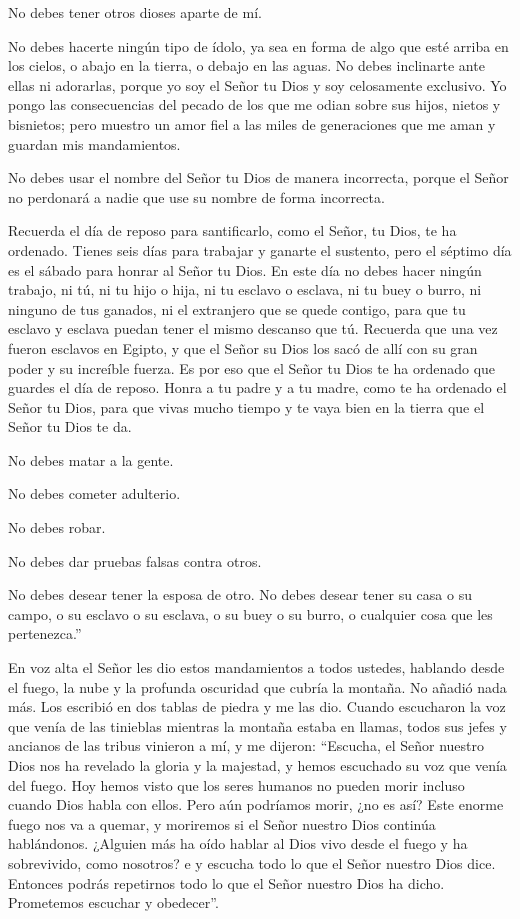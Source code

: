  No debes tener otros dioses aparte de mí.

 No debes hacerte ningún tipo de ídolo, ya sea en forma de
algo que esté arriba en los cielos, o abajo en la tierra, o debajo en
las aguas.  No debes inclinarte ante ellas ni adorarlas,
porque yo soy el Señor tu Dios y soy celosamente exclusivo. Yo pongo las
consecuencias del pecado de los que me odian sobre sus hijos, nietos y
bisnietos;  pero muestro un amor fiel a las miles de
generaciones que me aman y guardan mis mandamientos.

 No debes usar el nombre del Señor tu Dios de manera
incorrecta, porque el Señor no perdonará a nadie que use su nombre de
forma incorrecta.

 Recuerda el día de reposo para santificarlo, como el
Señor, tu Dios, te ha ordenado.  Tienes seis días para
trabajar y ganarte el sustento,  pero el séptimo día es el
sábado para honrar al Señor tu Dios. En este día no debes hacer ningún
trabajo, ni tú, ni tu hijo o hija, ni tu esclavo o esclava, ni tu buey o
burro, ni ninguno de tus ganados, ni el extranjero que se quede contigo,
para que tu esclavo y esclava puedan tener el mismo descanso que tú.
 Recuerda que una vez fueron esclavos en Egipto, y que el
Señor su Dios los sacó de allí con su gran poder y su increíble fuerza.
Es por eso que el Señor tu Dios te ha ordenado que guardes el día de
reposo.  Honra a tu padre y a tu madre, como te ha ordenado
el Señor tu Dios, para que vivas mucho tiempo y te vaya bien en la
tierra que el Señor tu Dios te da.

 No debes matar a la gente.

 No debes cometer adulterio.

 No debes robar.

 No debes dar pruebas falsas contra otros.

 No debes desear tener la esposa de otro. No debes desear
tener su casa o su campo, o su esclavo o su esclava, o su buey o su
burro, o cualquier cosa que les pertenezca.''

 En voz alta el Señor les dio estos mandamientos a todos
ustedes, hablando desde el fuego, la nube y la profunda oscuridad que
cubría la montaña. No añadió nada más. Los escribió en dos tablas de
piedra y me las dio.  Cuando escucharon la voz que venía de
las tinieblas mientras la montaña estaba en llamas, todos sus jefes y
ancianos de las tribus vinieron a mí,  y me dijeron:
``Escucha, el Señor nuestro Dios nos ha revelado la gloria y la
majestad, y hemos escuchado su voz que venía del fuego. Hoy hemos visto
que los seres humanos no pueden morir incluso cuando Dios habla con
ellos.  Pero aún podríamos morir, ¿no es así? Este enorme
fuego nos va a quemar, y moriremos si el Señor nuestro Dios continúa
hablándonos.  ¿Alguien más ha oído hablar al Dios vivo
desde el fuego y ha sobrevivido, como nosotros?  e y
escucha todo lo que el Señor nuestro Dios dice. Entonces podrás
repetirnos todo lo que el Señor nuestro Dios ha dicho. Prometemos
escuchar y obedecer''.

